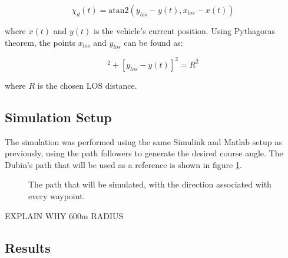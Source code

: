 \begin{equation}
	\chi_d(t) = \text{atan2}(y_{los} - y(t), x_{los} - x(t))
\end{equation}

where $x(t)$ and $y(t)$ is the vehicle's current position. Using Pythagoras theorem, the points $x_{los}$ and $y_{los}$ can be found as:

\begin{equation}
	[x_{los} - x(t)]^2 + [y_{los} - y(t)]^2 = R^2
\end{equation}

where $R$ is the chosen LOS distance.


\subsection{Simulation Setup}

The simulation was performed using the same Simulink and Matlab setup as previously, using the path followers to generate the desired course angle. The Dubin's path that will be used as a reference is shown in figure \ref{fig:dubins_reference}.

\begin{figure}[!ht]
    \centering
    \caption{The path that will be simulated, with the direction associated with every waypoint.}
	\label{fig:dubins_reference}
\end{figure}

EXPLAIN WHY 600m RADIUS

\subsection{Results}